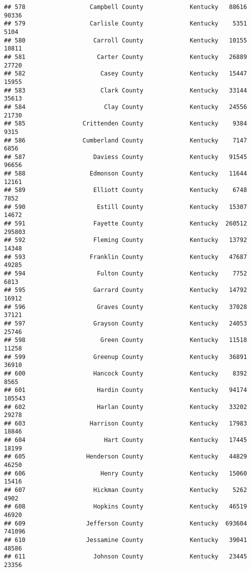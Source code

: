 \documentclass[
]{article}
\begin{document}
\begin{verbatim}
## 578                  Campbell County             Kentucky   88616   90336
## 579                  Carlisle County             Kentucky    5351    5104
## 580                   Carroll County             Kentucky   10155   10811
## 581                    Carter County             Kentucky   26889   27720
## 582                     Casey County             Kentucky   15447   15955
## 583                     Clark County             Kentucky   33144   35613
## 584                      Clay County             Kentucky   24556   21730
## 585                Crittenden County             Kentucky    9384    9315
## 586                Cumberland County             Kentucky    7147    6856
## 587                   Daviess County             Kentucky   91545   96656
## 588                  Edmonson County             Kentucky   11644   12161
## 589                   Elliott County             Kentucky    6748    7852
## 590                    Estill County             Kentucky   15307   14672
## 591                   Fayette County             Kentucky  260512  295803
## 592                   Fleming County             Kentucky   13792   14348
## 593                  Franklin County             Kentucky   47687   49285
## 594                    Fulton County             Kentucky    7752    6813
## 595                   Garrard County             Kentucky   14792   16912
## 596                    Graves County             Kentucky   37028   37121
## 597                   Grayson County             Kentucky   24053   25746
## 598                     Green County             Kentucky   11518   11258
## 599                   Greenup County             Kentucky   36891   36910
## 600                   Hancock County             Kentucky    8392    8565
## 601                    Hardin County             Kentucky   94174  105543
## 602                    Harlan County             Kentucky   33202   29278
## 603                  Harrison County             Kentucky   17983   18846
## 604                      Hart County             Kentucky   17445   18199
## 605                 Henderson County             Kentucky   44829   46250
## 606                     Henry County             Kentucky   15060   15416
## 607                   Hickman County             Kentucky    5262    4902
## 608                   Hopkins County             Kentucky   46519   46920
## 609                 Jefferson County             Kentucky  693604  741096
## 610                 Jessamine County             Kentucky   39041   48586
## 611                   Johnson County             Kentucky   23445   23356

\end{verbatim}
\end{document}
